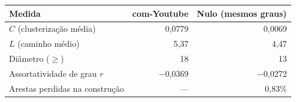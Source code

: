 \begin{tabular}{lrr}
    \toprule
    Medida & com-Youtube & Nulo (mesmos graus) \\
    \midrule
    $C$ (clusterização média) & 0,0779 & 0,0069 \\
    $L$ (caminho médio) & 5,37 & 4,47 \\
    Diâmetro ($\geq$) & 18 & 13 \\
    Assortatividade de grau $r$ & $-$0,0369 & $-$0,0272 \\
    Arestas perdidas na construção & --- & 0,83\% \\
    \bottomrule
\end{tabular}

